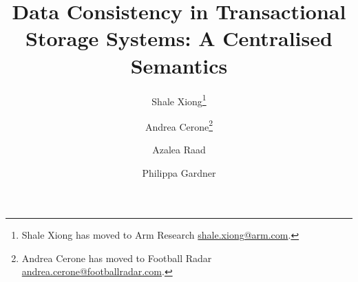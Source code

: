 \documentclass[a4paper,UKenglish,cleveref,autoref,thm-restate]{lipics-v2019}
\title{Data Consistency in Transactional Storage Systems: A Centralised Semantics}
\author{Shale Xiong\footnote{Shale Xiong has moved to Arm Research \url{shale.xiong@arm.com}.}}
       {Department of Computing, Imperial College London, UK}{shale.xiong14@ic.ac.uk}
       {}
       {The Department of Computing, Imperial College London, and EPSRC Fellowship `VeTSpec: Verified Trustworthy Software Specification' (EP/R034567/1)}
\author{Andrea Cerone\footnote{Andrea Cerone has moved to Football Radar \url{andrea.cerone@footballradar.com}.}}
       {Department of Computing, Imperial College London, UK}
       {andrea.cerone@fic.ac.uk}
       {}
       {EPSRC Programme Grant `REMS: Rigorous Engineering for Mainstream Systems' (EP/K008528/1)}
\author{Azalea Raad}
       {MPI-SWS, Germany}
       {azalea@mpi-sws.org}
       {}
       {ERC Horizon 2020 Consolidator Grant `RustBelt' (grant agreement no.\ 683289)}
\author{Philippa Gardner}
       {Department of Computing, Imperial College London, UK}
       {p.gardner@ic.ac.uk}
       {}
       {EPSRC Programme Grant `REMS: Rigorous Engineering for Mainstream Systems' (EP/K008528/1), and EPSRC Fellowship `VeTSpec: Verified Trustworthy Software Specification' (EP/R034567/1)}
\newcommand{\RootPath}{.}
\begin{document}
\maketitle

\begin{abstract}

\end{abstract}





%




\appendix

\end{document}
